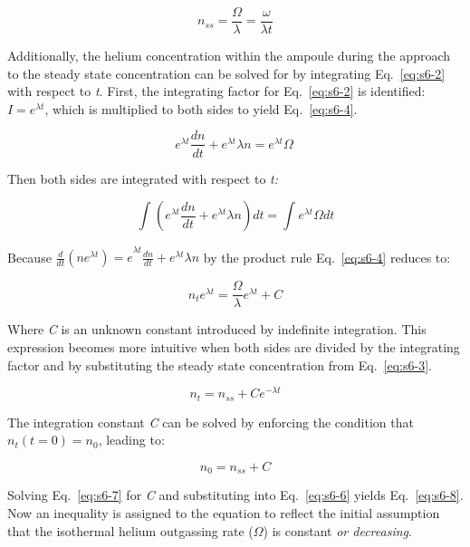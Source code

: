 \begin{equation}
n_{ss} = \frac{\Omega}{\lambda} = \frac{\omega}{\lambda t}
\label{eq:s6-3}
\end{equation}

Additionally, the helium concentration within the ampoule during the
approach to the steady state concentration can be solved for by
integrating Eq.~\eqref{eq:s6-2} with respect to \emph{t}. First, the integrating
factor for Eq.~\eqref{eq:s6-2} is identified: \(I = e^{\lambda t}\), which is
multiplied to both sides to yield Eq.~\eqref{eq:s6-4}.

\begin{equation}
e^{\lambda t}\frac{dn}{dt} + e^{\lambda t}\lambda n = e^{\lambda t}\Omega\
\label{eq:s6-4}
\end{equation}

Then both sides are integrated with respect to \emph{t:}

\[\int_{}^{}\left( e^{\lambda t}\frac{dn}{dt} + e^{\lambda t}\lambda n \right)dt = \int_{}^{}{e^{\lambda t}\Omega}dt\]

Because
\({\frac{d}{dt}(ne^{\lambda t}) = e}^{\lambda t}\frac{dn}{dt} + e^{\lambda t}\lambda n\)
by the product rule Eq.~\eqref{eq:s6-4} reduces to:

\begin{equation}
n_{t}e^{\lambda t} = \frac{\Omega}{\lambda}e^{\lambda t} + C
\label{eq:s6-5}
\end{equation}

Where \emph{C} is an unknown constant introduced by indefinite
integration. This expression becomes more intuitive when both sides are
divided by the integrating factor and by substituting the steady state
concentration from Eq.~\eqref{eq:s6-3}.

\begin{equation}
n_{t} = n_{ss} + Ce^{- \lambda t}
\label{eq:s6-6}
\end{equation}

The integration constant \emph{C} can be solved by enforcing the
condition that \(n_{t}(t = 0) = n_{0}\), leading to:

\begin{equation}
n_{0} = n_{ss} + C
\label{eq:s6-7}
\end{equation}

Solving Eq.~\eqref{eq:s6-7} for \emph{C} and substituting into Eq.~\eqref{eq:s6-6} yields
Eq.~\eqref{eq:s6-8}. Now an inequality is assigned to the equation to reflect the
initial assumption that the isothermal helium outgassing rate
(\(\Omega\)) is constant \emph{or decreasing}.

